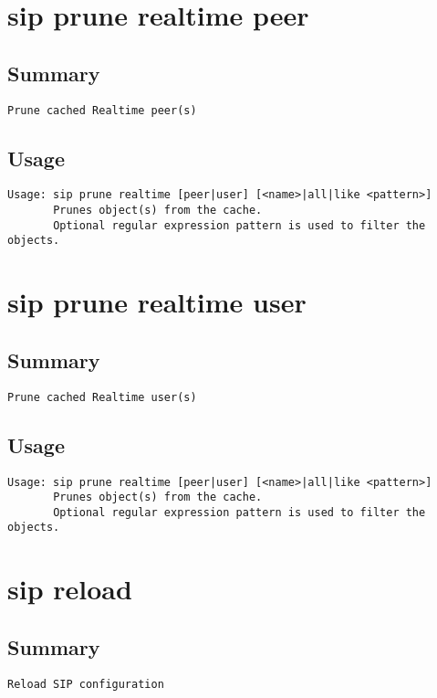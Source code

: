 \section{sip prune realtime peer}
\subsection{Summary}
\begin{verbatim}
Prune cached Realtime peer(s)
\end{verbatim}
\subsection{Usage}
\begin{verbatim}
Usage: sip prune realtime [peer|user] [<name>|all|like <pattern>]
       Prunes object(s) from the cache.
       Optional regular expression pattern is used to filter the objects.

\end{verbatim}


\section{sip prune realtime user}
\subsection{Summary}
\begin{verbatim}
Prune cached Realtime user(s)
\end{verbatim}
\subsection{Usage}
\begin{verbatim}
Usage: sip prune realtime [peer|user] [<name>|all|like <pattern>]
       Prunes object(s) from the cache.
       Optional regular expression pattern is used to filter the objects.

\end{verbatim}


\section{sip reload}
\subsection{Summary}
\begin{verbatim}
Reload SIP configuration
\end{verbatim}
